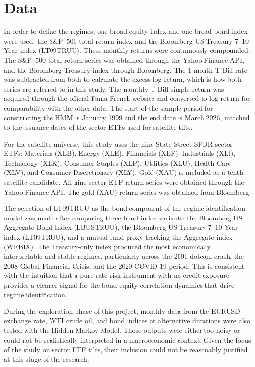 \documentclass[12pt, a4paper]{article}
\begin{document}
\clearpage
\clearpage
\section{Data}
\label{sec:data}

In order to define the regimes, one broad equity index and one broad bond index were used:
the S\&P~500 total return index and the Bloomberg US Treasury 7--10 Year index (LT09TRUU).
These monthly returns were continuously compounded. The S\&P~500 total return series was
obtained through the Yahoo Finance API, and the Bloomberg Treasury index through Bloomberg.
The 1-month T-Bill rate was subtracted from both to calculate the excess log return, which is
how both series are referred to in this study. The monthly T-Bill simple return was acquired
through the official Fama-French website and converted to log return for comparability with
the other data. The start of the sample period for constructing the HMM is January 1999 and
the end date is March 2026, matched to the issuance dates of the sector ETFs used for
satellite tilts.

For the satellite universe, this study uses the nine State Street SPDR sector ETFs: Materials
(XLB), Energy (XLE), Financials (XLF), Industrials (XLI), Technology (XLK), Consumer
Staples (XLP), Utilities (XLU), Health Care (XLV), and Consumer Discretionary (XLY). Gold
(XAU) is included as a tenth satellite candidate. All nine sector ETF return series were obtained through the Yahoo Finance API. The gold (XAU) return series was obtained from Bloomberg.

The selection of LT09TRUU as the bond component of the regime identification model was made
after comparing three bond index variants: the Bloomberg US Aggregate Bond Index (LBUSTRUU),
the Bloomberg US Treasury 7--10 Year index (LT09TRUU), and a mutual fund proxy tracking the
Aggregate index (WFBIX). The Treasury-only index produced the most economically interpretable
and stable regimes, particularly across the 2001 dotcom crash, the 2008 Global Financial
Crisis, and the 2020 COVID-19 period. This is consistent with the intuition that a
pure-rate-risk instrument with no credit exposure provides a cleaner signal for the
bond-equity correlation dynamics that drive regime identification.

During the exploration phase of this project, monthly data from the EURUSD exchange rate,
WTI crude oil, and bond indices at alternative durations were also tested with the Hidden
Markov Model. Those outputs were either too noisy or could not be realistically interpreted
in a macroeconomic context. Given the focus of the study on sector ETF tilts, their inclusion
could not be reasonably justified at this stage of the research.
\end{document}
